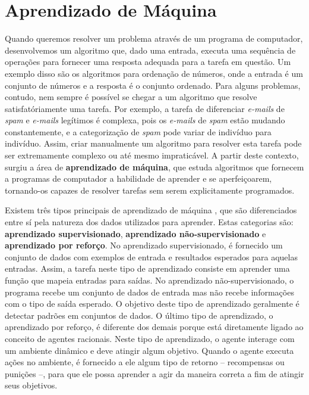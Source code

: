 \section{\label{section:machine-learning}Aprendizado de Máquina}
Quando queremos resolver um problema através de um programa de computador,
desenvolvemos um algoritmo que, dado uma entrada, executa uma sequência de
operações para fornecer uma resposta adequada para a tarefa em questão. Um
exemplo disso são os algoritmos para ordenação de números, onde a entrada é
um conjunto de números e a resposta é o conjunto ordenado. Para alguns
problemas, contudo, nem sempre é possível se chegar a um algoritmo que resolve
satisfatóriamente uma tarefa. Por exemplo, a tarefa de diferenciar
\textit{e-mails} de \textit{spam} e \textit{e-mails} legítimos é complexa, pois
os \textit{e-mails} de \textit{spam} estão mudando constantemente, e a
categorização de \textit{spam} pode variar de indivíduo para indivíduo. Assim,
criar manualmente um algoritmo para resolver esta tarefa pode ser extremamente
complexo ou até mesmo impraticável. A partir deste contexto, surgiu a área de
\textbf{aprendizado de máquina}, que estuda algoritmos que fornecem a programas
de computador a habilidade de aprender e se aperfeiçoarem, tornando-os capazes
de resolver tarefas sem serem explicitamente programados.

Existem três tipos principais de aprendizado de máquina \cite[cap.
18]{RussellNorvig200912}, que são diferenciados entre sí pela natureza dos dados
utilizados para aprender. Estas categorias são: \textbf{aprendizado
supervisionado}, \textbf{aprendizado não-supervisionado} e \textbf{aprendizado
por reforço}. No aprendizado supervisionado, é fornecido um conjunto de dados
com exemplos de entrada e resultados esperados para aquelas entradas. Assim, a
tarefa neste tipo de aprendizado consiste em aprender uma função que mapeia
entradas para saídas. No aprendizado não-supervisionado, o programa recebe um
conjunto de dados de entrada mas não recebe informações com o tipo de saída
esperado. O objetivo deste tipo de aprendizado geralmente é detectar padrões em
conjuntos de dados.  O último tipo de aprendizado, o aprendizado por reforço, é
diferente dos demais porque está diretamente ligado ao conceito de agentes
racionais.  Neste tipo de aprendizado, o agente interage com um ambiente
dinâmico e deve atingir algum objetivo. Quando o agente executa ações no
ambiente, é fornecido a ele algum tipo de retorno -- recompensas ou punições --,
para que ele possa aprender a agir da maneira correta a fim de atingir seus
objetivos.

